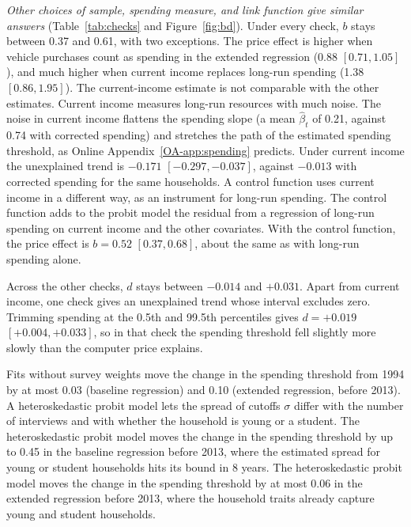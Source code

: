 \documentclass[11pt]{article}
\begin{document}
\emph{Other choices of sample, spending measure, and link function give similar answers} (Table~\ref{tab:checks} and Figure~\ref{fig:bd}). Under every check, $b$ stays between 0.37 and 0.61, with two exceptions. The price effect is higher when vehicle purchases count as spending in the extended regression (0.88 $[0.71, 1.05]$), and much higher when current income replaces long-run spending (1.38 $[0.86, 1.95]$). The current-income estimate is not comparable with the other estimates. Current income measures long-run resources with much noise. The noise in current income flattens the spending slope (a mean $\hat\beta_t$ of 0.21, against 0.74 with corrected spending) and stretches the path of the estimated spending threshold, as Online Appendix~\ref{OA-app:spending} predicts. Under current income the unexplained trend is $-0.171$ $[-0.297, -0.037]$, against $-0.013$ with corrected spending for the same households. A control function \citep{rivers1988} uses current income in a different way, as an instrument for long-run spending. The control function adds to the probit model the residual from a regression of long-run spending on current income and the other covariates. With the control function, the price effect is $b = 0.52$ $[0.37, 0.68]$, about the same as with long-run spending alone.

Across the other checks, $d$ stays between $-0.014$ and $+0.031$. Apart from current income, one check gives an unexplained trend whose interval excludes zero. Trimming spending at the 0.5th and 99.5th percentiles gives $d = +0.019$ $[+0.004, +0.033]$, so in that check the spending threshold fell slightly more slowly than the computer price explains.

Fits without survey weights move the change in the spending threshold from 1994 by at most 0.03 (baseline regression) and 0.10 (extended regression, before 2013). A heteroskedastic probit model lets the spread of cutoffs $\sigma$ differ with the number of interviews and with whether the household is young or a student. The heteroskedastic probit model moves the change in the spending threshold by up to 0.45 in the baseline regression before 2013, where the estimated spread for young or student households hits its bound in 8 years. The heteroskedastic probit model moves the change in the spending threshold by at most 0.06 in the extended regression before 2013, where the household traits already capture young and student households.
\end{document}
